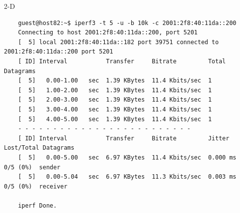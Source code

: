 \begin{maintask}{2-D}
  \begin{termout}[H]
    \caption{iperf3(順方向) の実行結果}\label{out:iperf_fwd}
    \begin{verbatim}
    guest@host82:~$ iperf3 -t 5 -u -b 10k -c 2001:2f8:40:11da::200                                           
    Connecting to host 2001:2f8:40:11da::200, port 5201                                                      
    [  5] local 2001:2f8:40:11da::182 port 39751 connected to 2001:2f8:40:11da::200 port 5201                
    [ ID] Interval           Transfer     Bitrate         Total Datagrams                                    
    [  5]   0.00-1.00   sec  1.39 KBytes  11.4 Kbits/sec  1                                                  
    [  5]   1.00-2.00   sec  1.39 KBytes  11.4 Kbits/sec  1                                                  
    [  5]   2.00-3.00   sec  1.39 KBytes  11.4 Kbits/sec  1                                                  
    [  5]   3.00-4.00   sec  1.39 KBytes  11.4 Kbits/sec  1                                                  
    [  5]   4.00-5.00   sec  1.39 KBytes  11.4 Kbits/sec  1                                                  
    - - - - - - - - - - - - - - - - - - - - - - - - -                                                        
    [ ID] Interval           Transfer     Bitrate         Jitter    Lost/Total Datagrams                     
    [  5]   0.00-5.00   sec  6.97 KBytes  11.4 Kbits/sec  0.000 ms  0/5 (0%)  sender                         
    [  5]   0.00-5.04   sec  6.97 KBytes  11.3 Kbits/sec  0.003 ms  0/5 (0%)  receiver                       
                                                                                                            
    iperf Done.       
    \end{verbatim}
  \end{termout}


\end{maintask}
